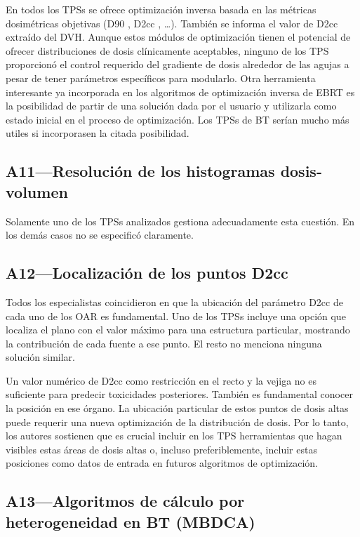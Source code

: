 \documentclass[
  a4paper,
]{scrreprt}
\begin{document}
En todos los TPSs se ofrece optimización inversa basada en las métricas
dosimétricas objetivas (D90 , D2cc , \ldots). También se informa el
valor de D2cc extraído del DVH. Aunque estos módulos de optimización
tienen el potencial de ofrecer distribuciones de dosis clínicamente
aceptables, ninguno de los TPS proporcionó el control requerido del
gradiente de dosis alrededor de las agujas a pesar de tener parámetros
específicos para modularlo. Otra herramienta interesante ya incorporada
en los algoritmos de optimización inversa de EBRT es la posibilidad de
partir de una solución dada por el usuario y utilizarla como estado
inicial en el proceso de optimización. Los TPSs de BT serían mucho más
utiles si incorporasen la citada posibilidad.

\hypertarget{sec-a11}{%
\subsection{A11---Resolución de los histogramas
dosis-volumen}\label{sec-a11}}

Solamente uno de los TPSs analizados gestiona adecuadamente esta
cuestión. En los demás casos no se especificó claramente.

\hypertarget{sec-a12}{%
\subsection{A12---Localización de los puntos D2cc}\label{sec-a12}}

Todos los especialistas coincidieron en que la ubicación del parámetro
D2cc de cada uno de los OAR es fundamental. Uno de los TPSs incluye una
opción que localiza el plano con el valor máximo para una estructura
particular, mostrando la contribución de cada fuente a ese punto. El
resto no menciona ninguna solución similar.

Un valor numérico de D2cc como restricción en el recto y la vejiga no es
suficiente para predecir toxicidades posteriores. También es fundamental
conocer la posición en ese órgano. La ubicación particular de estos
puntos de dosis altas puede requerir una nueva optimización de la
distribución de dosis. Por lo tanto, los autores sostienen que es
crucial incluir en los TPS herramientas que hagan visibles estas áreas
de dosis altas o, incluso preferiblemente, incluir estas posiciones como
datos de entrada en futuros algoritmos de optimización.

\hypertarget{sec-a13}{%
\subsection{A13---Algoritmos de cálculo por heterogeneidad en BT
(MBDCA)}\label{sec-a13}}
\end{document}
